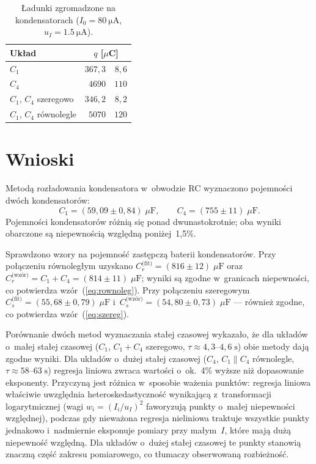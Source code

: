\documentclass[12pt, a4paper]{article}
\begin{document}
\begin{table}[H]
\centering
\caption{Ładunki zgromadzone na kondensatorach ($I_0 = \SI{80}{\micro\ampere}$,
         $u_I = \SI{1,5}{\micro\ampere}$).}\label{tab:charge}
\begin{tabular}{l r @{\;$\pm$\;} r}
\toprule
Układ & \multicolumn{2}{c}{$q$ [$\mu$C]} \\
\midrule
$C_1$                   & $367{,}3$ & $8{,}6$  \\
$C_4$                   & $4690$    & $110$    \\
$C_1$, $C_4$ szeregowo  & $346{,}2$ & $8{,}2$  \\
$C_1$, $C_4$ równolegle & $5070$    & $120$    \\
\bottomrule
\end{tabular}
\end{table}

\section{Wnioski}

Metodą rozładowania kondensatora w~obwodzie RC wyznaczono pojemności dwóch
kondensatorów:
\[
    C_1 = (59{,}09 \pm 0{,}84)\;\mu\mathrm{F}, \qquad
    C_4 = (755 \pm 11)\;\mu\mathrm{F}.
\]
Pojemności kondensatorów różnią się ponad dwunastokrotnie; oba wyniki obarczone
są niepewnością względną poniżej~1{,}5\%.

Sprawdzono wzory na pojemność zastępczą baterii kondensatorów. Przy połączeniu
równoległym uzyskano $C_r^\text{(fit)} = (816 \pm 12)\;\mu\mathrm{F}$
oraz $C_r^\text{(wzór)} = C_1 + C_4 = (814 \pm 11)\;\mu\mathrm{F}$;
wyniki są zgodne w~granicach niepewności, co potwierdza wzór~(\ref{eq:rownoleg}).
Przy połączeniu szeregowym $C_s^\text{(fit)} = (55{,}68 \pm 0{,}79)\;\mu\mathrm{F}$
i~$C_s^\text{(wzór)} = (54{,}80 \pm 0{,}73)\;\mu\mathrm{F}$ --- również zgodne,
co potwierdza wzór~(\ref{eq:szereg}).

Porównanie dwóch metod wyznaczania stałej czasowej wykazało, że dla układów
o~małej stałej czasowej ($C_1$, $C_1{+}C_4$ szeregowo, $\tau \approx 4{,}3$--$4{,}6\;\mathrm{s}$)
obie metody dają zgodne wyniki. Dla układów o~dużej stałej czasowej ($C_4$,
$C_1\|C_4$ równolegle, $\tau \approx 58$--$63\;\mathrm{s}$) regresja liniowa
zwraca wartości o~ok.~4\% wyższe niż dopasowanie eksponenty. Przyczyną jest
różnica w~sposobie ważenia punktów: regresja liniowa właściwie uwzględnia
heteroskedastyczność wynikającą z~transformacji logarytmicznej (wagi
$w_i = {(I_i/u_I)}^2$ faworyzują punkty o~małej niepewności względnej),
podczas gdy nieważona regresja nieliniowa traktuje wszystkie punkty jednakowo
i~nadmiernie eksponuje pomiary przy małym~$I$, które mają dużą niepewność
względną. Dla układów o~dużej stałej czasowej te punkty stanowią znaczną
część zakresu pomiarowego, co tłumaczy obserwowaną rozbieżność.
\end{document}
